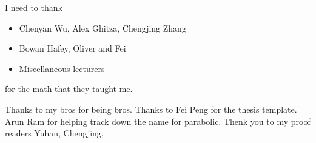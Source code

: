 I need to thank
\begin{itemize}
	\item Chenyan Wu,  Alex Ghitza,  Chengjing Zhang	
	\item Bowan Hafey, Oliver and Fei
    \item Miscellaneous lecturers
\end{itemize}
for the math that they taught me. 

Thanks to my bros for being bros. Thanks to Fei Peng for the thesis template. Arun Ram for helping track down the name for parabolic. Thenk you to my proof readers Yuhan, Chengjing, 
